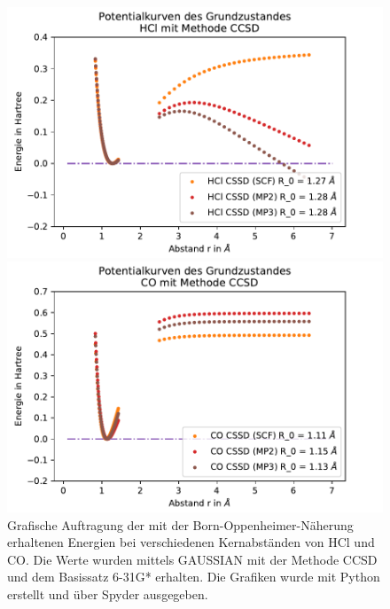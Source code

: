  
\begin{figure}[H]
	
\begin{minipage}{0.5\textwidth}
	\includegraphics[width=\textwidth]{Bilder/HCl_CCSD}
\end{minipage}
\begin{minipage}{0.5\textwidth}
	\includegraphics[width=\textwidth]{Bilder/CO_CCSD}
\end{minipage}


\caption{Grafische Auftragung der mit der Born-Oppenheimer-Näherung erhaltenen Energien bei verschiedenen Kernabständen von HCl und CO. Die Werte wurden mittels GAUSSIAN mit der Methode CCSD und dem Basissatz 6-31G* erhalten. Die Grafiken wurde mit Python erstellt und über Spyder ausgegeben.}


	\label{HCl_CCSD}
\end{figure}


